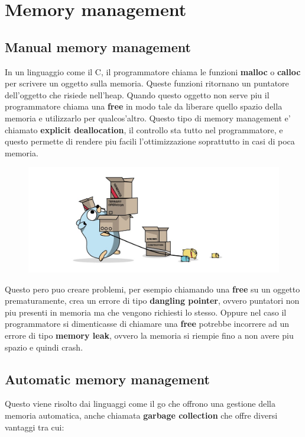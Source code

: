 \section{Memory management}
\subsection{Manual memory management}
In un linguaggio come il C, il programmatore chiama le funzioni \textbf{malloc} o \textbf{calloc} per scrivere un oggetto sulla memoria. Queste funzioni ritornano un puntatore dell'oggetto che risiede nell'heap. Quando questo oggetto non serve piu il programmatore chiama una \textbf{free} in modo tale da liberare quello spazio della memoria e utilizzarlo per qualcos'altro. \newline Questo tipo di memory management e' chiamato \textbf{explicit deallocation}, il controllo sta tutto nel programmatore, e questo permette di rendere piu facili l'ottimizzazione soprattutto in casi di poca memoria. \newline

\begin{figure}[h!]
  \includegraphics[width=\linewidth]{sections/golang-difficult.jpg}
  \label{fig: go1}
\end{figure}

Questo pero puo creare problemi, per esempio chiamando una \textbf{free} su un oggetto prematuramente, crea un errore di tipo \textbf{dangling pointer}, ovvero puntatori non piu presenti in memoria ma che vengono richiesti lo stesso. \newline
Oppure nel caso il programmatore si dimenticasse di chiamare una \textbf{free} potrebbe incorrere ad un errore di tipo \textbf{memory leak}, ovvero la memoria si riempie fino a non avere piu spazio e quindi crash. \newline

\subsection{Automatic memory management}
Questo viene risolto dai linguaggi come il go che offrono una gestione della memoria automatica, anche chiamata \textbf{garbage collection} che offre diversi vantaggi tra cui: \newline

